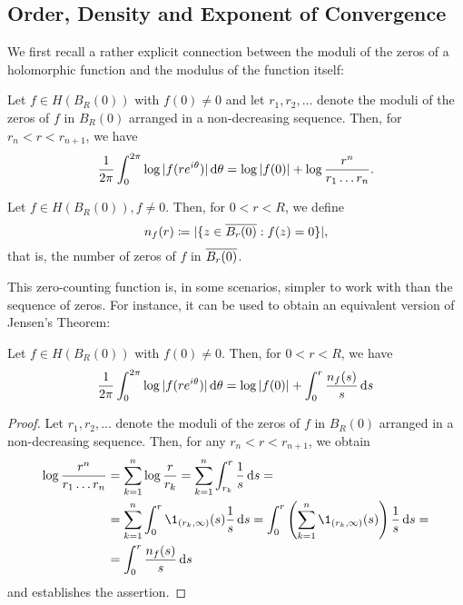 \subsection{Order, Density and Exponent of Convergence}

We first recall a rather explicit connection between the moduli of the zeros of a holomorphic function and the modulus of the function itself:

\begin{theorem}[Jensen] \label{thm:jensen}
    Let $f \in H(B_R(0))$ with $f(0) \neq 0$ and let $r_1, r_2, \hdots$ denote the moduli of the zeros of $f$ in $B_{R}(0)$ arranged in a non-decreasing sequence. Then, for $r_n < r < r_{n+1}$, we have
    \begin{equation}
        \frac{1}{2 \pi} \int_0^{2\pi} \log \vert f(r e^{i \theta}) \vert \mathop{}\!\mathrm{d} \theta = \log \vert f(0) \vert + \log \frac{r^n}{r_1 \hdots r_n}.
    \end{equation}
\end{theorem}

\begin{definition}
    Let $f \in H(B_R(0)), f \neq 0$. Then, for $0 < r < R$, we define
    \begin{equation}
        n_f(r) \coloneqq \vert \{ z \in \overline{B_r(0)} : f(z) = 0 \} \vert,
    \end{equation}
    that is, the number of zeros of $f$ in $\overline{B_{r}(0)}$.
\end{definition}

This zero-counting function is, in some scenarios, simpler to work with than the sequence of zeros. For instance, it can be used to obtain an equivalent version of Jensen's Theorem:

\begin{corollary} \label{cor:jensen-nf}
    Let $f \in H(B_R(0))$ with $f(0) \neq 0$. Then, for $0 < r < R$, we have
    \begin{equation}
        \frac{1}{2 \pi} \int_0^{2\pi} \log \vert f(re^{i \theta}) \vert \mathop{}\!\mathrm{d} \theta = \log \vert f(0) \vert + \int_0^r \frac{n_f(s)}{s} \mathop{}\!\mathrm{d} s
    \end{equation}
\end{corollary}

\begin{proof}
    Let $r_1, r_2, \hdots$ denote the moduli of the zeros of $f$ in $B_{R}(0)$ arranged in a non-decreasing sequence. Then, for any $r_n < r < r_{n+1}$, we obtain
    \begin{align*}
        \log \frac{r^n}{r_1 \hdots r_n} &= \sum_{k=1}^n \log \frac{r}{r_k} = \sum_{k=1}^n \int_{r_k}^r \frac{1}{s} \diff s = \\
        &= \sum_{k=1}^n \int_0^r \1_{(r_k, \infty)}(s) \frac{1}{s} \diff s = \int_0^r \left( \sum_{k=1}^n \1_{(r_k, \infty)}(s) \right) \frac{1}{s} \diff s = \\
        &= \int_0^r \frac{n_f(s)}{s} \diff s
    \end{align*}
    and  establishes the assertion.
\end{proof}

